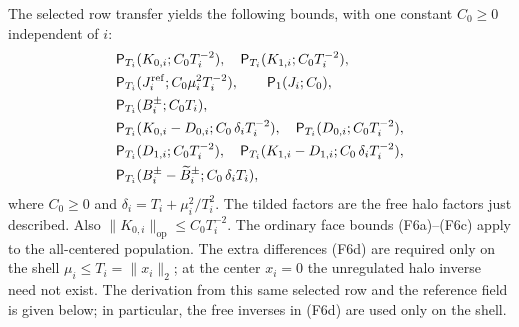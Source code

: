 The selected row transfer yields the following bounds, with one constant
$C_0\geq0$ independent of $i$:
\begin{align}
 &\mathsf P_{T_i}(K_{0,i};C_0T_i^{-2}),\quad
   \mathsf P_{T_i}(K_{1,i};C_0T_i^{-2}), \label{F6a}\\
 &\mathsf P_{T_i}(J_i^{\rm ref};C_0\mu_i^2T_i^{-2}),
 \qquad \mathsf P_{1}(J_i;C_0), \label{F6b}\\
 &\mathsf P_{T_i}(B_i^\pm;C_0T_i), \label{F6c}\\
 &\mathsf P_{T_i}(K_{0,i}-D_{0,i};C_0\,\delta_iT_i^{-2}),\quad
   \mathsf P_{T_i}(D_{0,i};C_0T_i^{-2}),\notag\\
 &
   \mathsf P_{T_i}(D_{1,i};C_0T_i^{-2}),\quad
   \mathsf P_{T_i}(K_{1,i}-D_{1,i};
                    C_0\,\delta_iT_i^{-2}),\notag\\
 &\mathsf P_{T_i}(B_i^\pm-\widetilde B_i^\pm;
                      C_0\,\delta_iT_i),\label{F6d}
\end{align}
where $C_0\geq0$ and $\delta_i=T_i+\mu_i^2/T_i^2$. The tilded factors are the
free halo factors just described. Also
$\|K_{0,i}\|_{\mathrm{op}}\leq C_0T_i^{-2}$. The ordinary face bounds
(F6a)--(F6c) apply to the all-centered population. The extra differences
(F6d) are required only on the shell $\mu_i\leq T_i=\|x_i\|_2$; at the
center $x_i=0$ the unregulated halo inverse need not exist.
The derivation from this same selected row and the reference field is given
below; in particular, the free inverses in (F6d) are used only on the shell.


